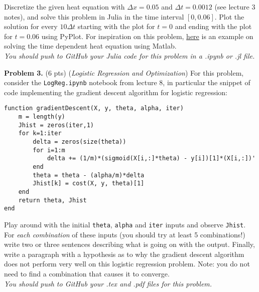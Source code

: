 \documentclass[12pt]{article}
\begin{document}
Discretize the given heat equation with $\Delta x = 0.05$ and $\Delta t = 0.0012$ (see lecture 3 notes), and solve this problem in Julia in the time interval $[0, 0.06]$. Plot the solution for every $10\Delta t$ starting with the plot for $t=0$ and ending with the plot for $t = 0.06$ using PyPlot. For inspiration on this problem, \href{http://www.colorado.edu/geography/class_homepages/geog_4023_s07/labs/html/PDE_lab.html}{here} is an example on solving the time dependent heat equation using Matlab.\\ 

\emph{\color{magenta} You should push to GitHub your Julia code for this problem in a .ipynb or .jl file.}\\
\newpage

{\bf Problem 3. }(6 pts) (\emph{Logistic Regression and Optimization}) For this problem, consider the \verb+LogReg.ipynb+ notebook from lecture 8, in particular the snippet of code implementing the gradient descent algorithm for logistic regression:
\begin{verbatim}
function gradientDescent(X, y, theta, alpha, iter)
    m = length(y)
    Jhist = zeros(iter,1)
    for k=1:iter
        delta = zeros(size(theta)) 
        for i=1:m
            delta += (1/m)*(sigmoid(X[i,:]*theta) - y[i])[1]*(X[i,:])'
        end
        theta = theta - (alpha/m)*delta
        Jhist[k] = cost(X, y, theta)[1]
    end
    return theta, Jhist
end
\end{verbatim}

Play around with the initial \verb+theta+, \verb+alpha+ and \verb+iter+ inputs and observe \verb+Jhist+. For \emph{each combination} of these inputs (you should try at least 5 combinations!) write two or three sentences describing what is going on with the output. Finally, write a paragraph with a hypothesis as to why the gradient descent algorithm does not perform very well on this logistic regression problem. Note: you do not need to find a combination that causes it to converge.\\

\emph{\color{magenta} You should push to GitHub your .tex and .pdf files for this problem.}\\
\end{document}
